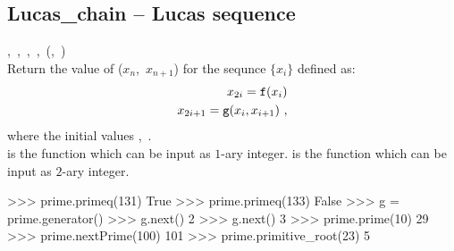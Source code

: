  \subsection{Lucas\_chain -- Lucas sequence}
   {,\ ,\ ,\ ,\ }{(,\ )}\\
   \spacing
   \quad Return the value of ($x_n$,\ $x_{n+1}$) for the sequnce $\{ x_i \}$ defined as:\\
   \begin{eqnarray*}
      x_{2i} = {\texttt f}(x_i)\\
      x_{2i+1} = {\texttt g}(x_i, x_{i+1})\ ,
   \end{eqnarray*}
   where the initial values ,\ .\\
   \spacing
   \quad {} is the function which can be input as $1$-ary integer.
    is the function which can be input as $2$-ary integer.\\
%
\begin{ex}
>>> prime.primeq(131)
True
>>> prime.primeq(133)
False
>>> g = prime.generator()
>>> g.next()
2
>>> g.next()
3
>>> prime.prime(10)
29
>>> prime.nextPrime(100)
101
>>> prime.primitive_root(23)
5
\end{ex}%
\C



